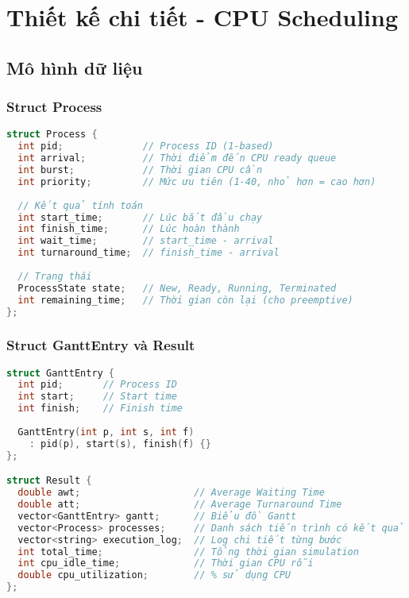 
\chapter{Thiết kế chi tiết - CPU Scheduling}
\label{ch:cpu_detail}

\section{Mô hình dữ liệu}

\subsection{Struct Process}

\begin{lstlisting}[language=C++,caption={Cấu trúc Process}]
struct Process {
  int pid;              // Process ID (1-based)
  int arrival;          // Thời điểm đến CPU ready queue
  int burst;            // Thời gian CPU cần
  int priority;         // Mức ưu tiên (1-40, nhỏ hơn = cao hơn)
  
  // Kết quả tính toán
  int start_time;       // Lúc bắt đầu chạy
  int finish_time;      // Lúc hoàn thành
  int wait_time;        // start_time - arrival
  int turnaround_time;  // finish_time - arrival
  
  // Trạng thái
  ProcessState state;   // New, Ready, Running, Terminated
  int remaining_time;   // Thời gian còn lại (cho preemptive)
};
\end{lstlisting}

\subsection{Struct GanttEntry và Result}

\begin{lstlisting}[language=C++,caption={Gantt Chart và Result}]
struct GanttEntry {
  int pid;       // Process ID
  int start;     // Start time
  int finish;    // Finish time
  
  GanttEntry(int p, int s, int f) 
    : pid(p), start(s), finish(f) {}
};

struct Result {
  double awt;                    // Average Waiting Time
  double att;                    // Average Turnaround Time
  vector<GanttEntry> gantt;      // Biểu đồ Gantt
  vector<Process> processes;     // Danh sách tiến trình có kết quả
  vector<string> execution_log;  // Log chi tiết từng bước
  int total_time;                // Tổng thời gian simulation
  int cpu_idle_time;             // Thời gian CPU rỗi
  double cpu_utilization;        // % sử dụng CPU
};
\end{lstlisting}

